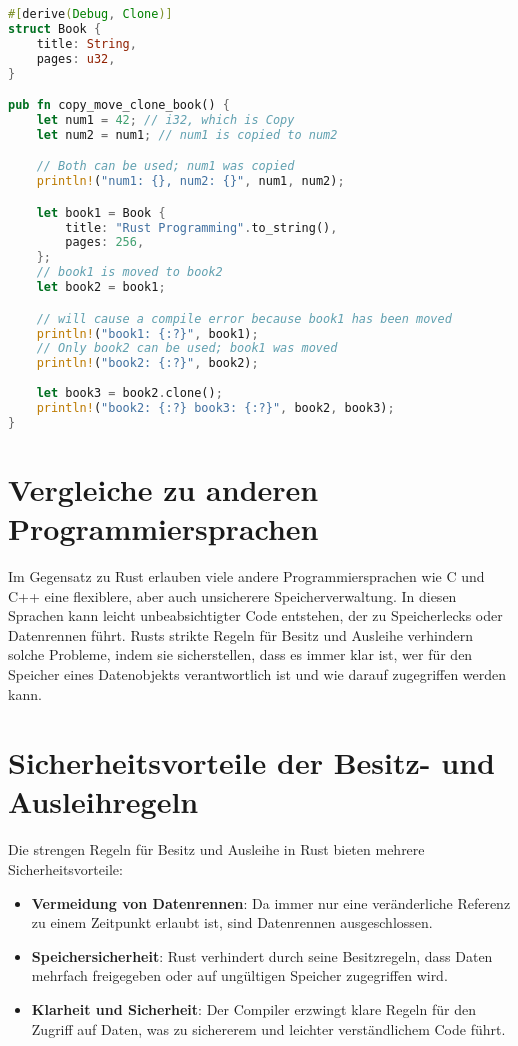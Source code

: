 \begin{lstlisting}[language=Rust, caption=Kopieren und Klonen von Strukturen Beispiel]
#[derive(Debug, Clone)]
struct Book {
    title: String,
    pages: u32,
}

pub fn copy_move_clone_book() {
    let num1 = 42; // i32, which is Copy
    let num2 = num1; // num1 is copied to num2

    // Both can be used; num1 was copied
    println!("num1: {}, num2: {}", num1, num2); 

    let book1 = Book {
        title: "Rust Programming".to_string(),
        pages: 256,
    };
    // book1 is moved to book2
    let book2 = book1; 

    // will cause a compile error because book1 has been moved
    println!("book1: {:?}", book1); 
    // Only book2 can be used; book1 was moved
    println!("book2: {:?}", book2); 
                                    
    let book3 = book2.clone();
    println!("book2: {:?} book3: {:?}", book2, book3);
}
\end{lstlisting}

\section{Vergleiche zu anderen Programmiersprachen}

Im Gegensatz zu Rust erlauben viele andere Programmiersprachen wie C und C++ eine flexiblere, aber auch unsicherere Speicherverwaltung. In diesen Sprachen kann leicht unbeabsichtigter Code entstehen, der zu Speicherlecks oder Datenrennen führt. Rusts strikte Regeln für Besitz und Ausleihe verhindern solche Probleme, indem sie sicherstellen, dass es immer klar ist, wer für den Speicher eines Datenobjekts verantwortlich ist und wie darauf zugegriffen werden kann.

\section{Sicherheitsvorteile der Besitz- und Ausleihregeln}

Die strengen Regeln für Besitz und Ausleihe in Rust bieten mehrere Sicherheitsvorteile:

\begin{itemize}
    \item \textbf{Vermeidung von Datenrennen}: Da immer nur eine veränderliche Referenz zu einem Zeitpunkt erlaubt ist, sind Datenrennen ausgeschlossen.
    \item \textbf{Speichersicherheit}: Rust verhindert durch seine Besitzregeln, dass Daten mehrfach freigegeben oder auf ungültigen Speicher zugegriffen wird.
    \item \textbf{Klarheit und Sicherheit}: Der Compiler erzwingt klare Regeln für den Zugriff auf Daten, was zu sichererem und leichter verständlichem Code führt.
\end{itemize}
